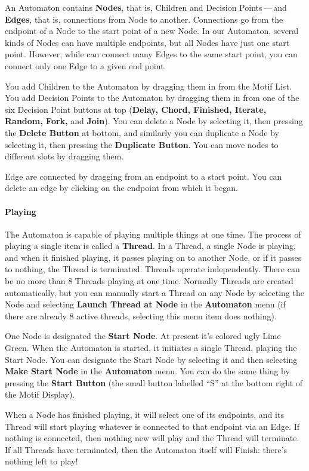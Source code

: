 \documentclass[twoside,10pt]{article}
\begin{document}
An Automaton contains {\bf Nodes}, that is, Children and Decision Points\,---\,and {\bf Edges}, that is, connections from Node to another.  Connections go from the endpoint of a Node to the start point of a new Node.  In our Automaton, several kinds of Nodes can have multiple endpoints, but all Nodes have just one start point.  However, while can connect many Edges to the same start point, you can connect only one Edge to a given end point.

You add Children to the Automaton by dragging them in from the Motif List.  You add Decision Points to the Automaton by dragging them in from one of the six Decision Point buttons at top ({\bf Delay, Chord, Finished, Iterate, Random, Fork,} and {\bf Join}).  You can delete a Node by selecting it, then pressing the {\bf Delete Button} at bottom, and similarly you can duplicate a Node by selecting it, then pressing the {\bf Duplicate Button}.  You can move nodes to different slots by dragging them. 

Edge are connected by dragging from an endpoint to a start point.  You can delete an edge by clicking on the endpoint from which it began.

\paragraph{Playing}

The Automaton is capable of playing multiple things at one time.  The process of playing a single item is called a {\bf Thread}.   In a Thread, a single Node is playing, and when it finished playing, it passes playing on to another Node, or if it passes to nothing, the Thread is terminated.  Threads operate independently.  There can be no more than 8 Threads playing at one time.  Normally Threads are created automatically, but you can manually start a Thread on any Node by selecting the Node and selecting {\bf Launch Thread at Node} in the {\bf Automaton} menu (if there are already 8 active threads, selecting this menu item does nothing).

One Node is designated the {\bf Start Node}.  At present it's colored ugly Lime Green.  When the Automaton is started, it initiates a single Thread, playing the Start Node.  You can designate the Start Node by selecting it and then selecting {\bf Make Start Node} in the {\bf Automaton} menu.  You can do the same thing by pressing the {\bf Start Button} (the small button labelled ``S'' at the bottom right of the Motif Display).

When a Node has finished playing, it will select one of its endpoints, and its Thread will start playing whatever is connected to that endpoint via an Edge.  If nothing is connected, then nothing new will play and the Thread will terminate.  If all Threads have terminated, then the Automaton itself will Finish: there's nothing left to play!
\end{document}

